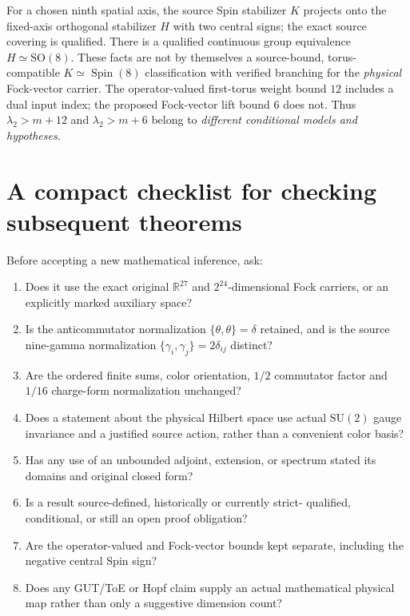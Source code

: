 For a chosen ninth spatial axis, the source Spin stabilizer $K$
projects onto the fixed-axis orthogonal stabilizer $H$ with two
central signs; the exact source covering is qualified. There is a
qualified continuous group equivalence $H\simeq\mathrm{SO}(8)$.
These facts are not by themselves a source-bound, torus-compatible
$K\simeq\operatorname{Spin}(8)$ classification with verified
branching for the \emph{physical} Fock-vector carrier. The
operator-valued first-torus weight bound $12$ includes a dual input
index; the proposed Fock-vector lift bound $6$ does not. Thus
$\lambda_2>m+12$ and $\lambda_2>m+6$ belong to \emph{different
conditional models and hypotheses}.

\section{A compact checklist for checking subsequent theorems}

Before accepting a new mathematical inference, ask:
\begin{enumerate}[leftmargin=1.6em]
 \item Does it use the exact original $\mathbb R^{27}$ and
 $2^{24}$-dimensional Fock carriers, or an explicitly marked auxiliary
 space?
 \item Is the anticommutator normalization $\{\theta,\theta\}=\delta$
 retained, and is the source nine-gamma normalization
 $\{\gamma_i,\gamma_j\}=2\delta_{ij}$ distinct?
 \item Are the ordered finite sums, color orientation, $1/2$
 commutator factor and $1/16$ charge-form normalization unchanged?
 \item Does a statement about the physical Hilbert space use actual
 $\mathrm{SU}(2)$ gauge invariance and a justified source action,
 rather than a convenient color basis?
 \item Has any use of an unbounded adjoint, extension, or spectrum
 stated its domains and original closed form?
 \item Is a result source-defined, historically or currently strict-
 qualified, conditional, or still an open proof obligation?
 \item Are the operator-valued and Fock-vector bounds kept separate,
 including the negative central Spin sign?
 \item Does any GUT/ToE or Hopf claim supply an actual mathematical
 physical map rather than only a suggestive dimension count?
\end{enumerate}

